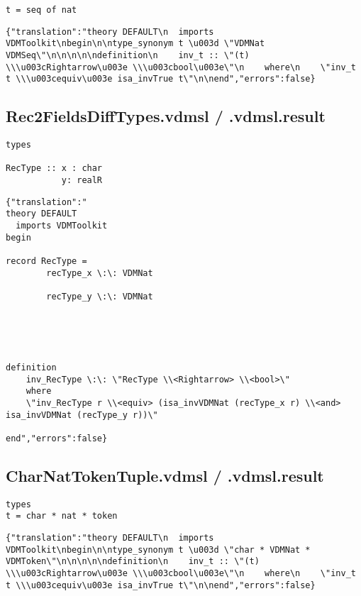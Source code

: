 \begin{appendices}
\begin{lstlisting}
t = seq of nat
\end{lstlisting}

\begin{lstlisting}
{"translation":"theory DEFAULT\n  imports VDMToolkit\nbegin\n\ntype_synonym t \u003d \"VDMNat VDMSeq\"\n\n\n\n\ndefinition\n    inv_t :: \"(t) \\\u003cRightarrow\u003e \\\u003cbool\u003e\"\n    where\n    \"inv_t t \\\u003cequiv\u003e isa_invTrue t\"\n\nend","errors":false}
\end{lstlisting}

\subsection{Rec2FieldsDiffTypes.vdmsl / .vdmsl.result}
\begin{lstlisting}
types

RecType :: x : char
           y: realR
\end{lstlisting}

\begin{lstlisting}
{"translation":"
theory DEFAULT
  imports VDMToolkit
begin

record RecType =
        recType_x \:\: VDMNat

        recType_y \:\: VDMNat

    



definition
    inv_RecType \:\: \"RecType \\<Rightarrow> \\<bool>\"
    where
    \"inv_RecType r \\<equiv> (isa_invVDMNat (recType_x r) \\<and> isa_invVDMNat (recType_y r))\"

end","errors":false}
\end{lstlisting}

\subsection{CharNatTokenTuple.vdmsl / .vdmsl.result} \label{charnat}
\begin{lstlisting}
types
t = char * nat * token
\end{lstlisting}

\begin{lstlisting}
{"translation":"theory DEFAULT\n  imports VDMToolkit\nbegin\n\ntype_synonym t \u003d \"char * VDMNat * VDMToken\"\n\n\n\n\ndefinition\n    inv_t :: \"(t) \\\u003cRightarrow\u003e \\\u003cbool\u003e\"\n    where\n    \"inv_t t \\\u003cequiv\u003e isa_invTrue t\"\n\nend","errors":false}
\end{lstlisting}


\end{appendices}
